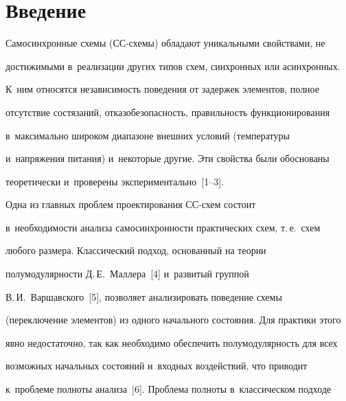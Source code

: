 







      \thispagestyle{headings}





\section{Введение}





\vspace*{-2pt}


       


   Самосинхронные схемы (СС-схемы) обладают уникальными свойствами, не 


достижимыми в~реализации других типов схем, синхронных или асинхронных. 


К~ним относятся независимость поведения от задержек элементов, полное 


отсутствие состязаний, отказобезопасность, правильность функционирования 


в~максимально широком диапазоне внешних условий (температуры 


и~напряжения питания) и~некоторые другие. Эти свойства были обоснованы 


теоретически и~проверены экспериментально~[1--3].


   


   Одна из главных проблем проектирования СС-схем состоит 


в~необходимости анализа самосинхронности практических схем, т.\,е.\ схем 


любого размера. Классический подход, основанный на теории 


полумодулярности Д.\,Е.~Маллера~[4] и~развитый группой 


В.\,И.~Варшавского~[5], позволяет анализировать поведение схемы 


(переключение элементов) из одного начального состояния. Для практики этого 


явно недостаточно, так как необходимо обеспечить полумодулярность для всех 


возможных начальных состояний и~входных воздействий, что приводит 


к~проблеме полноты анализа~[6]. Проблема полноты в~классическом подходе 


